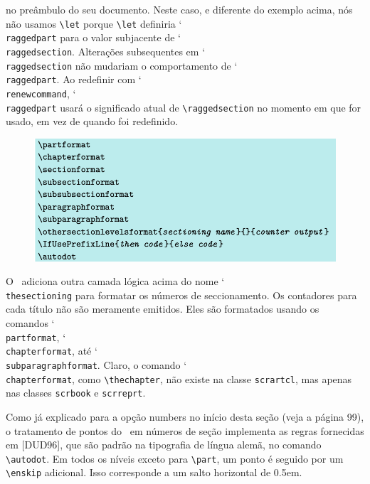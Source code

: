 no preâmbulo do seu documento. Neste caso, e diferente do exemplo acima, nós não usamos \verb|\let| porque \verb|\let| definiria \char`\\\texttt{rag\-ged\-part} para o valor subjacente de \char`\\\texttt{rag\-ged\-sec\-tion}. Alterações subsequentes em \char`\\\texttt{rag\-ged\-sec\-tion} não mudariam o comportamento de \char`\\\texttt{rag\-ged\-part}. Ao redefinir com \char`\\\texttt{re\-new\-com\-mand}, \char`\\\texttt{rag\-ged\-part} usará o significado atual de \verb|\raggedsection| no momento em que for usado, em vez de quando foi redefinido.

\begin{figure}
    \centering
    \includegraphics[width=0.8\linewidth]{imagens/imagem23.png}
\end{figure}

O \KOMAScript\ adiciona outra camada lógica acima do nome \char`\\\texttt{the\-sec\-tio\-ning} para formatar os números de seccionamento. Os contadores para cada título não são meramente emitidos. Eles são formatados usando os comandos \char`\\\texttt{part\-for\-mat}, \char`\\\texttt{chap\-ter\-for\-mat}, até \char`\\\texttt{sub\-pa\-ra\-graph\-for\-mat}. Claro, o comando \char`\\\texttt{chap\-ter\-for\-mat}, como \verb|\thechapter|, não existe na classe \texttt{scrartcl}, mas apenas nas classes \texttt{scrbook} e \texttt{scrreprt}.

Como já explicado para a opção numbers no início desta seção (veja a página 99), o tratamento de pontos do \KOMAScript\ em números de seção implementa as regras fornecidas em [DUD96], que são padrão na tipografia de língua alemã, no comando \verb|\autodot|. Em todos os níveis exceto para \verb|\part|, um ponto é seguido por um \verb|\enskip| adicional. Isso corresponde a um salto horizontal de 0.5em.
